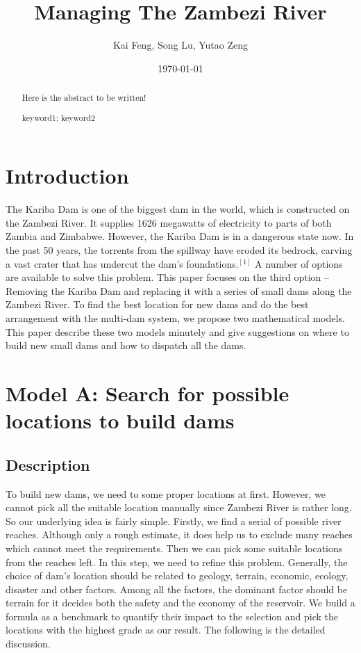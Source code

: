 \documentclass{mcmthesis}
\title{Managing The Zambezi River}
\author{Kai Feng, Song Lu, Yutao Zeng}
\date{\today}
\begin{document}
\begin{abstract}
Here is the abstract to be written!
\begin{keywords}
keyword1; keyword2
\end{keywords}
\end{abstract}
\maketitle
\section{Introduction}
\indent \indent The Kariba Dam is one of the biggest dam in the world, which is constructed on the Zambezi River. It supplies 1626 megawatts of electricity to parts of both Zambia and Zimbabwe. However, the Kariba Dam is in a dangerous state now. In the past 50 years, the torrents from the spillway have eroded its bedrock, carving a vast crater that has undercut the dam's foundations.$^{[1]}$ A number of options are available to solve this problem. This paper focuses on the third option -- Removing the Kariba Dam and replacing it with a series of small dams along the Zambezi River. To find the best location for new dams and do the best arrangement with the multi-dam system, we propose two mathematical models. This paper describe these two models minutely and give suggestions on where to build new small dams and how to dispatch all the dams. \\


\section{Model A: Search for possible locations to build dams}
\subsection{Description}
\indent \indent To build new dams, we need to some proper locations at first. However, we cannot pick all the suitable location manually since Zambezi River is rather long. So our underlying idea is fairly simple. Firstly, we find a serial of possible river reaches. Although only a rough estimate, it does help us to exclude many reaches which cannot meet the requirements. Then we can pick some suitable locations from the reaches left. In this step, we need to refine this problem. Generally, the choice of dam's location should be related to geology, terrain, economic, ecology, disaster and other factors. Among all the factors, the dominant factor should be terrain for it decides both the safety and the economy of the reservoir. We build a formula as a benchmark to quantify their impact to the selection and pick the locations with the highest grade as our result. The following is the detailed discussion. \\
\end{document}
